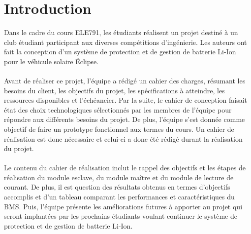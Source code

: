 \section{Introduction}

	\paragraph{}
	Dans le cadre du cours ELE791, les étudiants réalisent un projet destiné à un club étudiant participant aux diverses compétitions d’ingénierie. Les auteurs ont fait la conception d’un système de protection et de gestion de batterie Li-Ion pour le véhicule solaire Éclipse. 
	
	\paragraph{}
	Avant de réaliser ce projet, l’équipe a rédigé un cahier des charges, résumant les besoins du client, les objectifs du projet, les spécifications à atteindre, les ressources disponibles et l’échéancier. Par la suite, le cahier de conception faisait état des choix technologiques sélectionnés par les membres de l’équipe pour répondre aux différents besoins du projet. De plus, l’équipe s’est donnée comme objectif de faire un prototype fonctionnel aux termes du cours. Un cahier de réalisation est donc nécessaire et celui-ci a donc été rédigé durant la réalisation du projet.
	
	\paragraph{}
	Le contenu du cahier de réalisation inclut le rappel des objectifs et les étapes de réalisation du module esclave, du module maître et du module de lecture de courant. De plus, il est question des résultats obtenus en termes d’objectifs accomplis et d’un tableau comparant les performances et caractéristiques du BMS. Puis, l’équipe présente les améliorations futures à apporter au projet qui seront implantées par les prochains étudiants voulant continuer le système de protection et de gestion de batterie Li-Ion.
